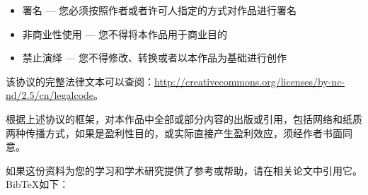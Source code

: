 \begin{itemize}
  \item 署名 — 您必须按照作者或者许可人指定的方式对作品进行署名
  \item 非商业性使用 — 您不得将本作品用于商业目的
  \item 禁止演绎 — 您不得修改、转换或者以本作品为基础进行创作
\end{itemize}

该协议的完整法律文本可以查阅：\url{http://creativecommons.org/licenses/by-nc-nd/2.5/cn/legalcode}。

根据上述协议的框架，对本作品中全部或部分内容的出版或引用，包括网络和纸质两种传播方式，如果是盈利性目的，或实际直接产生盈利效应，须经作者书面同意。

如果这份资料为您的学习和学术研究提供了参考或帮助，请在相关论文中引用它。Bib{\TeX}如下：


